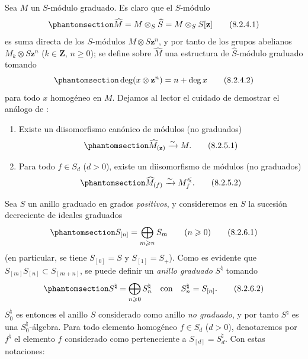 \documentclass[oneside,10pt]{amsart}
\renewcommand{\leq}{\leqslant}
\renewcommand{\geq}{\geqslant}
\let\EGAOriginalLabel\label
\renewcommand{\label}[1]{\phantomsection\EGAOriginalLabel{#1}}
\begin{document}
\begin{env}[8.2.4]
\label{II.8.2.4-fr}
Sea $M$ un $S$-módulo graduado.
Es claro que el $S$-módulo
\begin{equation}
\label{II.8.2.4.1-fr}
  \widehat{M}=M\otimes_S\widehat{S}=M\otimes_S S[\mathbf{z}]
\tag{8.2.4.1}
\end{equation}
es suma directa de los $S$-módulos $M\otimes S\mathbf{z}^n$, y por tanto de los grupos abelianos $M_k\otimes S\mathbf{z}^n$ ($k\in\mathbf{Z}$, $n\geq0$);
se define sobre $\widehat{M}$ una estructura de $\widehat{S}$-módulo graduado tomando
\begin{equation}
\label{II.8.2.4.2-fr}
  \deg(x\otimes\mathbf{z}^n)=n+\deg x
\tag{8.2.4.2}
\end{equation}
para todo $x$ homogéneo en $M$.
Dejamos al lector el cuidado de demostrar el análogo de :
\end{env}

\begin{lemma}[8.2.5]
\label{II.8.2.5-fr}
\begin{enumerate}
  \item[\rm{(i)}] Existe un diisomorfismo canónico de módulos (no graduados)
    \begin{equation}
\label{II.8.2.5.1-fr}
  \widehat{M}_{(\mathbf{z})}\xrightarrow{\sim}M.
\tag{8.2.5.1}
\end{equation}
  \item[\rm{(ii)}] Para todo $f\in S_d$ ($d>0$), existe un diisomorfismo de módulos (no graduados)
    \begin{equation}
\label{II.8.2.5.2-fr}
  \widehat{M}_{(f)}\xrightarrow{\sim}M_f^{\leq}.
\tag{8.2.5.2}
\end{equation}
\end{enumerate}
\end{lemma}

\begin{env}[8.2.6]
\label{II.8.2.6-fr}
Sea $S$ un anillo graduado en grados \emph{positivos}, y consideremos en $S$ la sucesión decreciente de ideales graduados
\begin{equation}
\label{II.8.2.6.1-fr}
  S_{[n]}=\bigoplus_{m\geq n}S_m\qquad(n\geq0)
\tag{8.2.6.1}
\end{equation}
(en particular, se tiene $S_{[0]}=S$ y $S_{[1]}=S_+$).
Como es evidente que $S_{[m]}S_{[n]}\subset S_{[m+n]}$, se puede definir un \emph{anillo graduado} $S^\natural$ tomando
\begin{equation}
\label{II.8.2.6.2-fr}
  S^\natural=\bigoplus_{n\geq0}S_n^\natural
  \quad\text{con}\quad S_n^\natural=S_{[n]}.
\tag{8.2.6.2}
\end{equation}
$S_0^\natural$ es entonces el anillo $S$ considerado como anillo \emph{no graduado}, y por tanto $S^\natural$ es una $S_0^\natural$-álgebra.
Para todo elemento homogéneo $f\in S_d$ ($d>0$), denotaremos por $f^\natural$ el elemento $f$ considerado como perteneciente a $S_{[d]}=S_d^\natural$.
Con estas notaciones:
\end{env}
\end{document}
